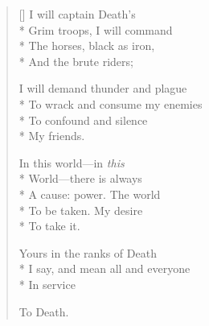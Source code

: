\label{ch:lear_bb}
\settowidth{\versewidth}{I say,   and mean all and everyone}
\begin{verse}[\versewidth]
 I will captain Death's\\*
Grim troops, I will command\\*
The horses, black as iron,\\*
And the brute riders;

I will demand thunder and plague\\*
To wrack and consume my enemies\\*
To confound and silence\\*
My friends.

\qquad In this world---in \textit{this}\\*
World---there is always\\*
A cause: power.   The world\\*
To be taken.   My desire\\*
To take it.

Yours in the ranks of Death\\*
I say,   and mean all and everyone\\*
In service

To Death.
\end{verse}
